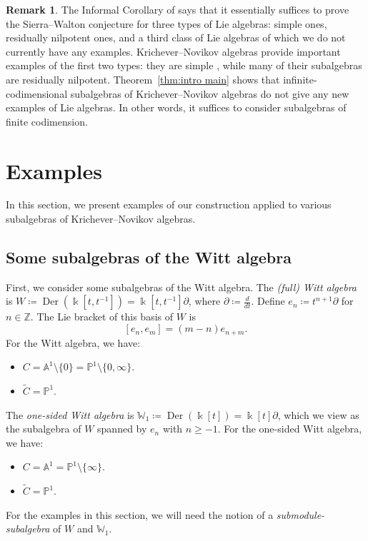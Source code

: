 \documentclass[12pt]{amsart}
\theoremstyle{plain}
\theoremstyle{definition}
\newtheorem{remark}[theorem]{Remark}
\numberwithin{equation}{section}
\def\ZZ{\mathbb{Z}}
\def\Aa{\mathbb{A}}
\def\PP{\mathbb{P}}
\def\WW{\mathbb{W}}
\def\kk{\Bbbk}
\DeclareMathOperator{\Der}{Der}
\def\del{\partial}
\newcommand{\diff}[1]{\frac{d}{d#1}}
\begin{document}
\begin{remark}
    The Informal Corollary of \cite{Mathieu} says that it essentially suffices to prove the Sierra--Walton conjecture \cite[Conjecture 0.1]{SierraWalton} for three types of Lie algebras: simple ones, residually nilpotent ones, and a third class of Lie algebras of which we do not currently have any examples. Krichever--Novikov algebras provide important examples of the first two types: they are simple \cite{Siebert}, while many of their subalgebras are residually nilpotent. Theorem~\ref{thm:intro main} shows that infinite-codimensional subalgebras of Krichever--Novikov algebras do not give any new examples of Lie algebras. In other words, it suffices to consider subalgebras of finite codimension.
\end{remark}

\section{Examples}\label{sec:examples}

In this section, we present examples of our construction applied to various subalgebras of Krichever--Novikov algebras.

\subsection{Some subalgebras of the Witt algebra}

First, we consider some subalgebras of the Witt algebra. The \emph{(full) Witt algebra} is $W \coloneqq \Der(\kk[t,t^{-1}]) = \kk[t,t^{-1}]\del$, where $\del \coloneqq \diff{t}$. Define $e_n \coloneqq t^{n + 1}\del$ for $n \in \ZZ$. The Lie bracket of this basis of $W$ is
$$[e_n,e_m] = (m - n)e_{n+m}.$$
For the Witt algebra, we have:
\begin{itemize}
    \item $C = \Aa^1 \setminus \{0\} = \PP^1 \setminus \{0, \infty\}$.
    \item $\widetilde{C} = \PP^1$.
\end{itemize}
The \emph{one-sided Witt algebra} is $\WW_1 \coloneqq \Der(\kk[t]) = \kk[t]\del$, which we view as the subalgebra of $W$ spanned by $e_n$ with $n \geq -1$. For the one-sided Witt algebra, we have:
\begin{itemize}
    \item $C = \Aa^1 = \PP^1 \setminus \{\infty\}$.
    \item $\widetilde{C} = \PP^1$.
\end{itemize}
For the examples in this section, we will need the notion of a \emph{submodule-subalgebra} of $W$ and $\WW_1$.
\end{document}
